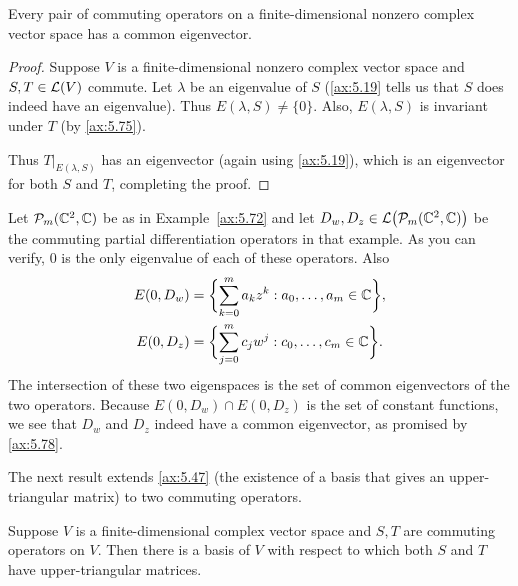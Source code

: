 \begin{result}\label{ax:5.78}
Every pair of commuting operators on a finite-dimensional nonzero complex
vector space has a common eigenvector.
\end{result}

\begin{proof}
Suppose $V$ is a finite-dimensional nonzero complex vector space and
$S,T\in\mathcal{L}(V)$ commute. Let $\lambda$ be an eigenvalue of $S$ (\ref{ax:5.19}
tells us that $S$ does indeed have an eigenvalue). Thus $E(\lambda,S)\ne\{0\}$.
Also, $E(\lambda,S)$ is invariant under $T$ (by \ref{ax:5.75}).

Thus $T|_{E(\lambda,S)}$ has an eigenvector (again using \ref{ax:5.19}), which
is an eigenvector for both $S$ and $T$, completing the proof.
\end{proof}

\begin{example}\label{ax:5.79}
Let $\mathcal{P}_m(\mathbb{C}^2,\mathbb{C})$ be as in Example~\ref{ax:5.72} and let
$D_w,D_z\in\mathcal{L}\bigl(\mathcal{P}_m(\mathbb{C}^2,\mathbb{C})\bigr)$ be the commuting partial
differentiation operators in that example. As you can verify, $0$ is the only
eigenvalue of each of these operators. Also
\begin{align*}
E(0,D_w) &= \biggl\{\sum_{k=0}^m a_kz^k : a_0,\dots,a_m\in\mathbb{C}\biggr\},\\
E(0,D_z) &= \biggl\{\sum_{j=0}^m c_jw^j : c_0,\dots,c_m\in\mathbb{C}\biggr\}.
\end{align*}
The intersection of these two eigenspaces is the set of common eigenvectors of
the two operators. Because $E(0,D_w)\cap E(0,D_z)$ is the set of constant
functions, we see that $D_w$ and $D_z$ indeed have a common eigenvector, as
promised by \ref{ax:5.78}.
\end{example}

The next result extends \ref{ax:5.47} (the existence of a basis that gives an
upper-triangular matrix) to two commuting operators.

\begin{result}\label{ax:5.80}
Suppose $V$ is a finite-dimensional complex vector space and $S,T$ are
commuting operators on $V$. Then there is a basis of $V$ with respect to which
both $S$ and $T$ have upper-triangular matrices.
\end{result}

